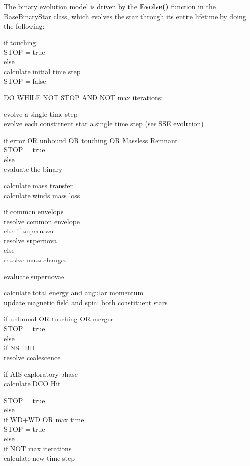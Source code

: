 The binary evolution model is driven by the \textbf{Evolve()} function in the BaseBinaryStar class, which evolves the star through its entire lifetime by doing the following:

\bigskip
if touching \\
\tabto{3em} STOP = true \\
else \\
\tabto{3em}calculate initial time step \\
\tabto{3em}STOP = false

\medskip
DO WHILE NOT STOP AND NOT max iterations:

\tabto{3em}evolve a single time step \\
\tabto{5em}evolve each constituent star a single time step (see SSE evolution)

\tabto{3em}if error OR unbound OR touching OR Massless Remnant \\
\tabto{5em}STOP = true \\
\tabto{3em}else \\
\tabto{5em}evaluate the binary

\tabto{7em}calculate mass transfer \\
\tabto{7em}calculate winds mass loss

\tabto{7em}if common envelope \\
\tabto{9em}resolve common envelope \\
\tabto{7em}else if supernova \\
\tabto{9em}resolve supernova \\
\tabto{7em}else \\
\tabto{9em}resolve mass changes

\tabto{7em}evaluate supernovae

\tabto{7em}calculate total energy and angular momentum \\
\tabto{7em}update magnetic field and spin: both constituent stars

\medskip
\tabto{5em}if unbound OR touching OR merger \\
\tabto{7em}STOP = true \\
\tabto{5em}else \\
\tabto{7em}if NS+BH \\
\tabto{9em}resolve coalescence

\tabto{9em}if AIS exploratory phase \\
\tabto{11em}calculate DCO Hit

\tabto{9em}STOP = true \\
\tabto{7em}else \\
\tabto{9em}if WD+WD OR max time \\
\tabto{11em}STOP = true \\
\tabto{9em}else \\
\tabto{11em}if NOT max iterations \\
\tabto{13em}calculate new time step
